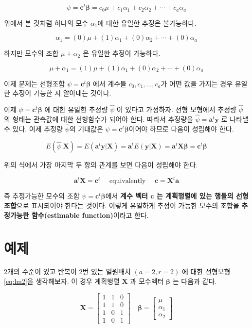\documentclass[
]{book}
\newcommand{\bm}[1]{\boldsymbol{\mathbf{#1}}}
\begin{document}
\[ \psi = \bm c^t \bm \beta = c_0 \mu + c_1 \alpha_1 + c_2 \alpha_2 + \cdots + c_a \alpha_a \]

위에서 본 것처럼 하나의 모수 \(\alpha_1\)에 대한 유일한 추정은 불가능하다.

\[  \alpha_1 = (0) \mu + (1) \alpha_1 + (0) \alpha_2 + \cdots + (0) \alpha_a \]

하지만 모수의 조합 \(\mu+ \alpha_2\) 은 유일한 추정이 가능하다.

\[  \mu + \alpha_1 = (1) \mu + (1) \alpha_1 + (0) \alpha_2 + \cdots + (0) \alpha_a \]

이제 문제는 선형조합 \(\psi= \bm c^t \bm \beta\) 에서 계수들 \(c_0, c_1, \dots, c_a\)가 어떤 값을 가지는 경우 유일한 추정이 가능한 지 알아내는 것이다.

이제 \(\psi = \bm c^t \bm \beta\) 에 대한 유일한 추정량 \(\hat \psi\) 이 있다고 가정하자. 선형 모형에서 추정량 \(\hat \psi\)의 형태는 관측값에 대한 선형함수가 되어야 한다. 따라서 추정량을 \(\hat \psi = \bm a^t \bm y\) 로 나타낼 수 있다. 이제 추정량 \(\hat \psi\)의 기대값은 \(\psi=\bm c^t \bm \beta\)이어야 하므로 다음이 성립해야 한다.

\[ E(\hat \psi| \bm X) = E(\bm a^t \bm y| \bm X) = \bm a^t E(\bm y| \bm X) = \bm a^t \bm X \bm \beta = \bm c^t \bm \beta \]

위의 식에서 가장 마지막 두 항의 관계를 보면 다음이 성립해야 한다.

\begin{equation}
\bm a^t \bm X = \bm c^t  \quad \text{ equivalently }\quad \bm c = \bm X^t \bm a
\label{eq:estimable}
\end{equation}

즉 추정가능한 모수의 조합 \(\psi = \bm c^t \bm \beta\)에서 \textbf{계수 벡터 \(\bm c\) 는 계획행렬에 있는 행들의 선형 조합}으로 표시되어야 한다는 것이다. 이렇게 유일하게 추정이 가능한
모수의 조합을 \textbf{추정가능한 함수(estimable function)}이라고 한다.

\hypertarget{uxc608uxc81c}{%
\section{예제}\label{uxc608uxc81c}}

2개의 수준이 있고 반복이 2번 있는 일원배치 \((a=2,r=2)\) 에 대한 선형모형 \eqref{eq:lm2}을 생각해보자. 이 경우 계획행렬 \(\bm X\) 과 모수벡터 \(\bm \beta\) 는 다음과 같다.

\begin{equation}
\bm X = 
\begin{bmatrix}
1 & 1 & 0  \\
1 & 1 & 0  \\
1 & 0 & 1  \\
1 & 0 & 1  
\end{bmatrix}
\quad 
\bm \beta = 
\begin{bmatrix}
\mu \\
\alpha_1 \\
\alpha_2 
\end{bmatrix}
\end{equation}
\end{document}
